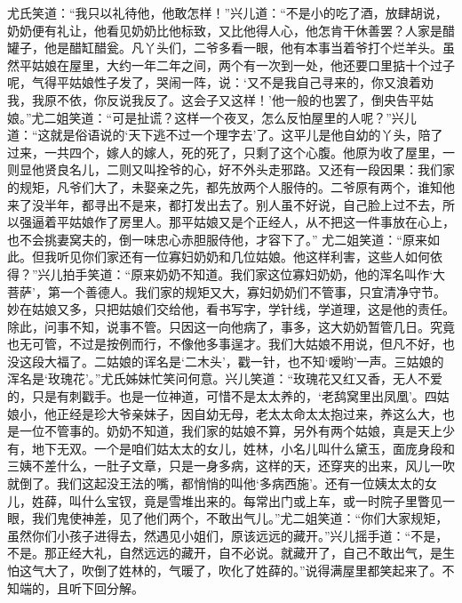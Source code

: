 \documentclass[12pt,oneside]{book}
\begin{document}
尤氏笑道：“我只以礼待他，他敢怎样！”兴儿道：“不是小的吃了酒，放肆胡说，奶奶便有礼让，他看见奶奶比他标致，又比他得人心，他怎肯干休善罢？人家是醋罐子，他是醋缸醋瓮。凡丫头们，二爷多看一眼，他有本事当着爷打个烂羊头。虽然平姑娘在屋里，大约一年二年之间，两个有一次到一处，他还要口里掂十个过子呢，气得平姑娘性子发了，哭闹一阵，说：‘又不是我自己寻来的，你又浪着劝我，我原不依，你反说我反了。这会子又这样！’他一般的也罢了，倒央告平姑娘。”尤二姐笑道：“可是扯谎？这样一个夜叉，怎么反怕屋里的人呢？”兴儿道：“这就是俗语说的‘天下逃不过一个理字去’了。这平儿是他自幼的丫头，陪了过来，一共四个，嫁人的嫁人，死的死了，只剩了这个心腹。他原为收了屋里，一则显他贤良名儿，二则又叫拴爷的心，好不外头走邪路。又还有一段因果：我们家的规矩，凡爷们大了，未娶亲之先，都先放两个人服侍的。二爷原有两个，谁知他来了没半年，都寻出不是来，都打发出去了。别人虽不好说，自己脸上过不去，所以强逼着平姑娘作了房里人。那平姑娘又是个正经人，从不把这一件事放在心上，也不会挑妻窝夫的，倒一味忠心赤胆服侍他，才容下了。”
尤二姐笑道：“原来如此。但我听见你们家还有一位寡妇奶奶和几位姑娘。他这样利害，这些人如何依得？”兴儿拍手笑道：“原来奶奶不知道。我们家这位寡妇奶奶，他的浑名叫作‘大菩萨’，第一个善德人。我们家的规矩又大，寡妇奶奶们不管事，只宜清净守节。妙在姑娘又多，只把姑娘们交给他，看书写字，学针线，学道理，这是他的责任。除此，问事不知，说事不管。只因这一向他病了，事多，这大奶奶暂管几日。究竟也无可管，不过是按例而行，不像他多事逞才。我们大姑娘不用说，但凡不好，也没这段大福了。二姑娘的诨名是‘二木头’，戳一针，也不知‘嗳哟’一声。三姑娘的浑名是‘玫瑰花’。”尤氏姊妹忙笑问何意。兴儿笑道：“玫瑰花又红又香，无人不爱的，只是有刺戳手。也是一位神道，可惜不是太太养的，‘老鸹窝里出凤凰’。四姑娘小，他正经是珍大爷亲妹子，因自幼无母，老太太命太太抱过来，养这么大，也是一位不管事的。奶奶不知道，我们家的姑娘不算，另外有两个姑娘，真是天上少有，地下无双。一个是咱们姑太太的女儿，姓林，小名儿叫什么黛玉，面庞身段和三姨不差什么，一肚子文章，只是一身多病，这样的天，还穿夹的出来，风儿一吹就倒了。我们这起没王法的嘴，都悄悄的叫他‘多病西施’。还有一位姨太太的女儿，姓薛，叫什么宝钗，竟是雪堆出来的。每常出门或上车，或一时院子里瞥见一眼，我们鬼使神差，见了他们两个，不敢出气儿。”尤二姐笑道：“你们大家规矩，虽然你们小孩子进得去，然遇见小姐们，原该远远的藏开。”兴儿摇手道：“不是，不是。那正经大礼，自然远远的藏开，自不必说。就藏开了，自己不敢出气，是生怕这气大了，吹倒了姓林的，气暖了，吹化了姓薛的。”说得满屋里都笑起来了。不知端的，且听下回分解。
\end{document}
